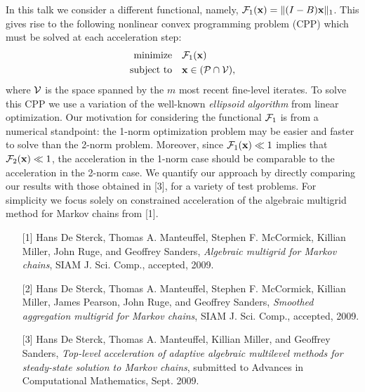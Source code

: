 \documentclass{report}
\begin{document}
In this talk we consider a different functional, namely, $\mathcal{F}_1({\bf x}) =
\|(I-B){\bf x}\|_1$. This gives rise to the following nonlinear convex
programming problem (CPP) which must be solved at each acceleration step:
\begin{align*}
\text{minimize} & \quad \mathcal{F}_1({\bf x})\\
\text{subject to} & \quad {\bf x} \in (\mathcal{P} \cap \mathcal{V}),
\end{align*}
where $\mathcal{V}$ is the space spanned by the $m$ most recent fine-level
iterates. To solve this CPP we use a variation of the well-known {\em
ellipsoid algorithm} from linear optimization. Our motivation for
considering the functional $\mathcal{F}_1$ is from a numerical standpoint: the
1-norm optimization problem may be easier and faster to solve than the
2-norm problem. Moreover, since $\mathcal{F}_1({\bf x}) \ll 1$ implies that
$\mathcal{F}_2({\bf x}) \ll 1$, the acceleration in the 1-norm case should be
comparable to the acceleration in the 2-norm case. We quantify our
approach by directly comparing our results with those obtained in [3],
for a variety of test problems. For simplicity we focus solely on
constrained acceleration of the algebraic multigrid method for Markov
chains from [1].

\vspace{7mm}

{}

\begin{enumerate}
\item[{[1]}] {\sc Hans De Sterck, Thomas A. Manteuffel, Stephen F.
McCormick, Killian Miller, John Ruge, and Geoffrey Sanders},
{\em Algebraic multigrid for Markov chains}, SIAM J. Sci. Comp., accepted, 2009.

\item[{[2]}] {\sc Hans De Sterck, Thomas A. Manteuffel, Stephen F.
McCormick, Killian Miller, James Pearson, John Ruge, and Geoffrey
Sanders}, {\em Smoothed aggregation multigrid for Markov chains}, SIAM J.
Sci. Comp., accepted, 2009.

\item[{[3]}] {\sc Hans De Sterck, Thomas A. Manteuffel, Killian Miller,
and Geoffrey Sanders},
{\em Top-level acceleration of adaptive algebraic multilevel methods for
steady-state solution to Markov
chains}, submitted to Advances in Computational Mathematics, Sept. 2009.
\end{enumerate}
\end{document}

